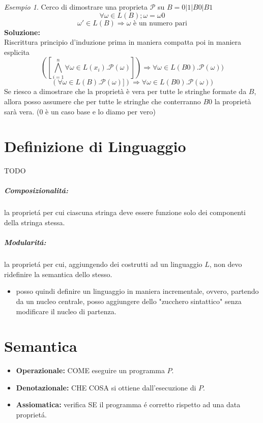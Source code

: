 \documentclass[a4paper]{report}
\newcommand{\prop}{\mathcal{P}}
\theoremstyle{definition} \newtheorem*{defi}{Def}
\theoremstyle{plain} \newtheorem{lemma}{Lemma}
\theoremstyle{plain} \newtheorem{teo}{Teorema}
\theoremstyle{remark} \newtheorem*{es}{Esempio}
\begin{document}
\begin{es}
  Cerco di dimostrare una proprieta $\prop$ su $B=0|1|B0|B1$ \\
  \[
    \forall \omega \in L(B);\omega=\omega0
  \]
  \[
    \omega' \in L(B) \Rightarrow \text{$\omega$ è un numero pari}
  \]
  \textbf{Soluzione:} \\
  Riscrittura principio d'induzione prima in maniera compatta poi in maniera esplicita
   \[
    ([\bigwedge_{i=1}^{n} \forall \omega \in L(x_i).\prop(\omega)])
    \Rightarrow \forall \omega \in L(B0).\prop(\omega))
  \]
  \[
    (\forall \omega \in L(B).\prop(\omega)])
    \Rightarrow \forall \omega \in L(B0).\prop(\omega))
  \]
  Se riesco a dimostrare che la proprietà è vera per tutte le stringhe formate da $B$, allora posso assumere che per tutte le stringhe che conterranno $B0$ la proprietà sarà vera. ($0$ è un caso base e lo diamo per vero)

\end{es}

\chapter{Definizione di Linguaggio}
TODO
\paragraph{Composizionalit\'a:}
la propriet\'a per cui ciascuna stringa deve essere funzione solo dei componenti della stringa stessa.
\paragraph{Modularit\'a:}
la propriet\'a per cui, aggiungendo dei costrutti ad un linguaggio $L$, non devo ridefinire la semantica dello stesso.
\begin{itemize}
\item posso quindi definire un linguaggio in maniera incrementale, ovvero, partendo da un nucleo centrale, posso aggiungere dello "zucchero sintattico" senza modificare il nucleo di partenza.
\end{itemize}

\chapter{Semantica}
\begin{itemize}
\item {\bf Operazionale:} COME eseguire un programma $P$.
\item {\bf Denotazionale:} CHE COSA si ottiene dall'esecuzione di $P$.
\item {\bf Assiomatica:} verifica SE il programma \'e corretto rispetto ad una data propriet\'a.
\end{itemize}
\end{document}
